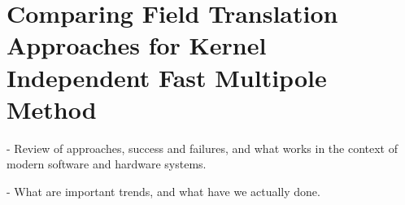 \chapter{Comparing Field Translation Approaches for Kernel Independent Fast Multipole Method}\label{chpt:field_translation}
\thispagestyle{chaptertitle} %

- Review of approaches, success and failures, and what works in the context of modern software and hardware systems.

- What are important trends, and what have we actually done.